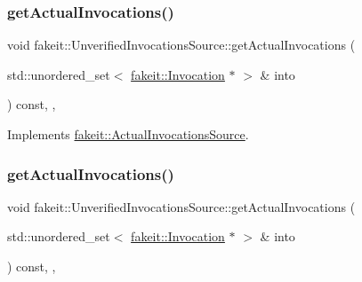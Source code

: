 \mbox{\label{structfakeit_1_1UnverifiedInvocationsSource_a889468fefa500d0f7f524f8235a67b0c}} 
\subsubsection{\texorpdfstring{getActualInvocations()}{getActualInvocations()}\hspace{0.1cm}{\footnotesize\ttfamily [2/9]}}
{\footnotesize\ttfamily void fakeit\+::\+Unverified\+Invocations\+Source\+::get\+Actual\+Invocations (\begin{DoxyParamCaption}\item[{std\+::unordered\+\_\+set$<$ \mbox{\hyperlink{structfakeit_1_1Invocation}{fakeit\+::\+Invocation}} $\ast$ $>$ \&}]{into }\end{DoxyParamCaption}) const\hspace{0.3cm}{\ttfamily [inline]}, {\ttfamily [override]}, {\ttfamily [virtual]}}



Implements \mbox{\hyperlink{structfakeit_1_1ActualInvocationsSource_a274de522e11e1f9b8d70c6e0be9e5a9b}{fakeit\+::\+Actual\+Invocations\+Source}}.

\mbox{\label{structfakeit_1_1UnverifiedInvocationsSource_a889468fefa500d0f7f524f8235a67b0c}} 
\subsubsection{\texorpdfstring{getActualInvocations()}{getActualInvocations()}\hspace{0.1cm}{\footnotesize\ttfamily [3/9]}}
{\footnotesize\ttfamily void fakeit\+::\+Unverified\+Invocations\+Source\+::get\+Actual\+Invocations (\begin{DoxyParamCaption}\item[{std\+::unordered\+\_\+set$<$ \mbox{\hyperlink{structfakeit_1_1Invocation}{fakeit\+::\+Invocation}} $\ast$ $>$ \&}]{into }\end{DoxyParamCaption}) const\hspace{0.3cm}{\ttfamily [inline]}, {\ttfamily [override]}, {\ttfamily [virtual]}}



